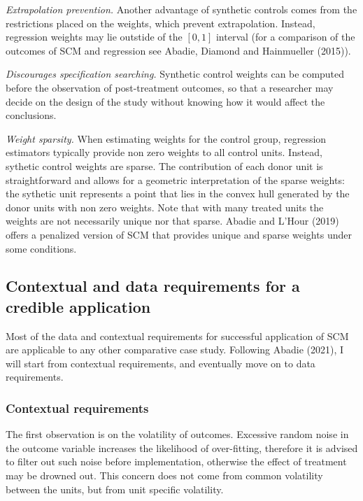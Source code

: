 \documentclass[12pt,a4paper,draft]{article}
\begin{document}
\emph{Extrapolation prevention.} Another advantage of synthetic controls comes from the 
restrictions placed on the weights, which prevent extrapolation. Instead, 
regression weights may lie outstide of the $[0,1]$ interval (for a comparison 
of the outcomes of SCM and regression see Abadie, Diamond and Hainmueller (2015)). 

\emph{Discourages specification searching.} Synthetic control weights can be computed 
before the observation of post-treatment outcomes, so that a researcher may decide 
on the design of the study without knowing how it would affect the conclusions.

\emph{Weight sparsity.} When estimating weights for 
the control group, regression estimators typically provide non zero weights to all control 
units. Instead, sythetic control weights are sparse. The contribution of each 
donor unit is straightforward and allows for a geometric interpretation of the 
sparse weights: the sythetic unit represents a point that lies in the convex hull 
generated by the donor units with non zero weights.
Note that with many treated units the weights are not necessarily unique nor 
that sparse. Abadie and L'Hour (2019) offers a penalized version of SCM that 
provides unique and sparse weights under some conditions.



\subsection{Contextual and data requirements for a credible application}

Most of the data and contextual requirements for successful application of 
SCM are applicable to any other comparative case study. Following Abadie (2021), I 
will start from contextual requirements, and eventually move on to data requirements.


\subsubsection{Contextual requirements}

The first observation is on the volatility of outcomes. Excessive random noise in the 
outcome variable increases the likelihood of over-fitting, therefore it is advised to 
filter out such noise before implementation, otherwise the effect of treatment 
may be drowned out. This concern does not come from common volatility between the 
units, but from unit specific volatility.
\end{document}
